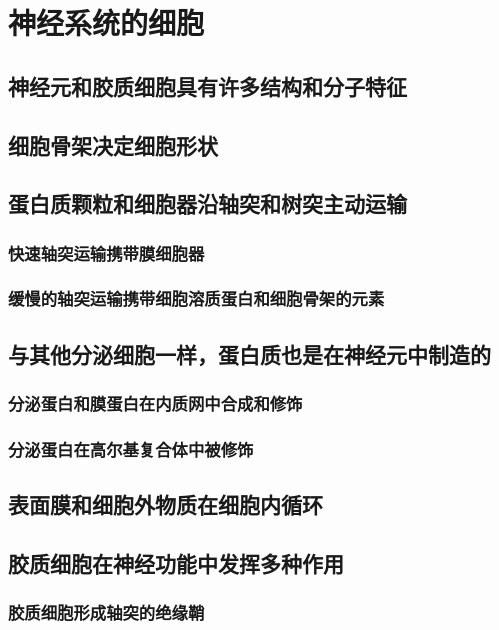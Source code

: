 \chapter{神经系统的细胞}

\section{神经元和胶质细胞具有许多结构和分子特征}

\section{细胞骨架决定细胞形状}

\section{蛋白质颗粒和细胞器沿轴突和树突主动运输}
\subsection{快速轴突运输携带膜细胞器}
\subsection{缓慢的轴突运输携带细胞溶质蛋白和细胞骨架的元素}


\section{与其他分泌细胞一样，蛋白质也是在神经元中制造的}
\subsection{分泌蛋白和膜蛋白在内质网中合成和修饰}
\subsection{分泌蛋白在高尔基复合体中被修饰}

\section{表面膜和细胞外物质在细胞内循环}

\section{胶质细胞在神经功能中发挥多种作用}
\subsection{胶质细胞形成轴突的绝缘鞘}
